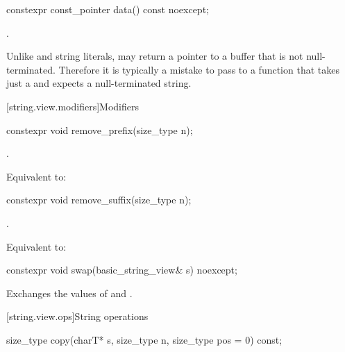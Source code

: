 %
\begin{itemdecl}
constexpr const_pointer data() const noexcept;
\end{itemdecl}

\begin{itemdescr}
\pnum
\returns
{}.

\pnum
\begin{note}
Unlike  and string literals,
 may return a pointer to a buffer that is not null-terminated.
Therefore it is typically a mistake to pass  to a function that takes just a  and expects a null-terminated string.
\end{note}
\end{itemdescr}

[string.view.modifiers]{Modifiers}

%
\begin{itemdecl}
constexpr void remove_prefix(size_type n);
\end{itemdecl}

\begin{itemdescr}
\pnum
\requires
{}.

\pnum
\effects
Equivalent to: 
\end{itemdescr}

%
\begin{itemdecl}
constexpr void remove_suffix(size_type n);
\end{itemdecl}

\begin{itemdescr}
\pnum
\requires
{}.

\pnum
\effects
Equivalent to: 
\end{itemdescr}

%
\begin{itemdecl}
constexpr void swap(basic_string_view& s) noexcept;
\end{itemdecl}

\begin{itemdescr}
\pnum
\effects
Exchanges the values of  and .
\end{itemdescr}

[string.view.ops]{String operations}

%
\begin{itemdecl}
size_type copy(charT* s, size_type n, size_type pos = 0) const;
\end{itemdecl}

